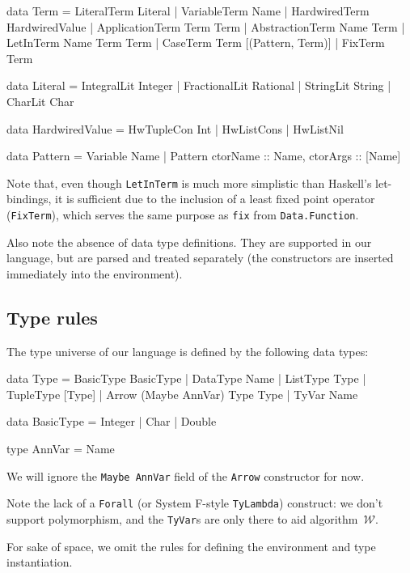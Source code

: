 \documentclass[a4paper]{scrartcl}
\newcommand{\algow}{algorithm~$\mathcal{W}$}
\begin{document}
\begin{code}
data Term = LiteralTerm     Literal
          | VariableTerm    Name
          | HardwiredTerm   HardwiredValue
          | ApplicationTerm Term Term
          | AbstractionTerm Name Term
          | LetInTerm       Name Term Term
          | CaseTerm        Term [(Pattern, Term)]
          | FixTerm         Term

data Literal = IntegralLit Integer
             | FractionalLit Rational
             | StringLit String
             | CharLit Char

data HardwiredValue = HwTupleCon Int 
                    | HwListCons
                    | HwListNil

data Pattern = Variable Name
             | Pattern {ctorName :: Name, ctorArgs :: [Name]}
\end{code}

Note that, even though \texttt{LetInTerm} is much more simplistic than
Haskell's let-bindings, it is sufficient due to the inclusion of a least
fixed point operator (\texttt{FixTerm}), which serves the same purpose as
\texttt{fix} from \texttt{Data.Function}.

Also note the absence of data type definitions. They are supported in our
language, but are parsed and treated separately (the constructors are
inserted immediately into the environment).

\subsection{Type rules}
The type universe of our language is defined by the following data types:

\begin{code}
data Type = BasicType BasicType
          | DataType Name
          | ListType Type
          | TupleType [Type]
          | Arrow (Maybe AnnVar) Type Type
          | TyVar Name

data BasicType = Integer
               | Char
               | Double

type AnnVar = Name
\end{code}

We will ignore the \texttt{Maybe AnnVar} field of the \texttt{Arrow} constructor
for now.

Note the lack of a \texttt{Forall} (or System F-style \texttt{TyLambda})
construct: we don't support polymorphism, and the \texttt{TyVar}s are
only there to aid \algow{}.

For sake of space, we omit the rules for defining the environment and
type instantiation.
\end{document}
